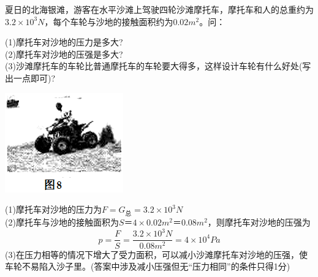 \documentclass[12pt]{exam}%
\begin{document}
\begin{Aquestions}
\begin{questions}
\question
夏日的北海银滩，游客在水平沙滩上驾驶四轮沙滩摩托车，摩托车和人的总重约为$3.2 \times 10^3 N$，每个车轮与沙地的接触面积约为$0.02m^2$。问：
\begin{multicols}{2}
(1)摩托车对沙地的压力是多大?\\
(2)摩托车对沙地的压强是多大?\\
(3)沙滩摩托车的车轮比普通摩托车的车轮要大得多，这样设计车轮有什么好处(写出一点即可)?  
\columnbreak
\begin{center}
\includegraphics[scale=0.9]{figures/图片+12.png}
\end{center}
\end{multicols}

\begin{solution}[18ex]
(1)摩托车对沙地的压力为$F=G_\textrm{总}=3.2\times 10^3N$\\
(2)摩托车与沙地的接触面积为$S＝4\times 0.02m^2＝0.08m^2$，则摩托车对沙地的压强为
\begin{equation*}
p=\frac{F}{S}=\frac{3.2\times 10^3 N}{0.08m^2}=4\times 10^4 Pa
\end{equation*}
(3)在压力相等的情况下增大了受力面积，可以减小沙滩摩托车对沙地的压强，使车轮不易陷入沙子里。(答案中涉及减小压强但无“压力相同”的条件只得1分)
\end{solution}


\end{questions}
\end{Aquestions}



\end{document}
